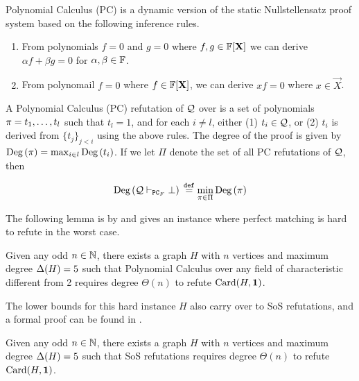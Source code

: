 \documentclass[11pt]{article}
\begin{document}
Polynomial Calculus (PC) is a dynamic version of the static Nullstellensatz proof system \citep[Section 1.3]{fleming2019semialgebraic} based on the following inference rules.
\begin{enumerate}
	\item From polynomials $f=0$ and $g=0$ where $f,g \in \mathbb{F}[\mathbf{X}]$ we can derive $\alpha f + \beta g = 0$ for $\alpha, \beta \in \mathbb{F}$.
	\item From polynomail $f=0$ where $f \in \mathbb{F}[\mathbf{X}]$, we can derive $xf=0$ where $x \in \vec{X}$.
\end{enumerate}

\begin{definition}\label{def:poly-calc-refutations}
A Polynomial Calculus (PC) refutation of $\mathcal{Q}$ over is a set of polynomials $\pi = t_1, \dots, t_l$	such that $t_l = 1$, and for each $i \neq l$, either (1) $t_i \in \mathcal{Q}$, or (2) $t_i$ is derived from $\{t_j\}_{j < i}$ using the above rules. 
The degree of the proof is given by $\text{Deg}\left(\pi\right) = \max_{i \in l}\text{Deg}\left(t_i\right)$. If we let $\Pi$ denote the set of all PC refutations of $\mathcal{Q}$, then  

\[ \text{Deg}\left(\mathcal{Q} \vdash_{\texttt{PC}_F} \bot\right) \text{}\overset{\mathtt{def}}{=} \min_{\pi \in \Pi}\text{Deg}\left(\pi\right)\]
\end{definition}

The following lemma is by \citet{buss1999linear} and gives an instance where perfect matching is hard to refute in the worst case.
\begin{lemma}\label{lemma:worst-case-instance-PC}Given any odd $n \in \mathbb{N}$, there exists a graph $H$ with $n$ vertices and maximum degree $\Delta(H)= 5$ such that Polynomial Calculus over any field of characteristic different from 2 requires degree $\Theta(n)$ to refute $\text{Card}(H, \mathbf{1})$.
\end{lemma}

The lower bounds for this hard instance $H$ also carry over to SoS refutations, and a formal proof can be found in \citep[Theorem A.3]{Austrin_2022}.

\begin{lemma}\label{lemma:worst-case-instance-sos}
Given any odd $n \in \mathbb{N}$, there exists a graph $H$ with $n$ vertices and maximum degree $\Delta(H)= 5$ such that SoS refutations requires degree $\Theta(n)$ to refute $\text{Card}(H, \mathbf{1})$.
\end{lemma}
\end{document}
